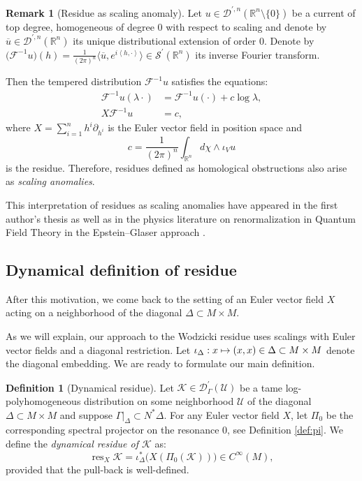 \documentclass[10pt]{amsart}
\let\pazocal\mathscr
\def\mto{\mathchoice{\longmapsto}{\mapsto}{\mapsto}{\mapsto}}
\theoremstyle{definition}
\newtheorem{definition}[theorem]{Definition}
\newtheorem{remark}[theorem]{Remark}
\newcommand\rr{{\mathbb R}}
\let\euler X
\let\Feuler V
\let\exd u
\DeclareMathOperator{\resnorm}{res}
\newcommand{\resdyn}{{\resnorm_\euler}}
\begin{document}
\begin{remark}[Residue as scaling anomaly]\label{l:scalanomal}
Let $\exd\in \pazocal{D}^{\prime,n}(\rr^n\setminus\{0\})$ be a current of top degree, homogeneous of degree $0$ with respect to scaling and denote by $\overline{\exd}\in \pazocal{D}^{\prime,n}(\rr^n)$ its unique distributional extension of order $0$.
Denote by $\big(\pazocal{F}^{-1}\exd\big)(h)=\frac{1}{(2\pi)^n}\langle \overline{\exd}, e^{i\left\langle h,\cdot \right\rangle}\rangle\in \pazocal{S}^\prime(\rr^n)$ its inverse Fourier transform.

Then the tempered distribution $\pazocal{F}^{-1}\exd$ satisfies the equations:
\[
\begin{aligned}
\pazocal{F}^{-1}\exd(\lambda\cdot)&=\pazocal{F}^{-1}\exd(\cdot)+c\log\lambda,\\
\euler \pazocal{F}^{-1}\exd&=c,
\end{aligned}
\]
where $\euler=\sum_{i=1}^n h^i\partial_{h^i}$ is the Euler vector field in position space and
\[
c=\frac{1}{(2\pi)^n}\int_{\rr^n} d\chi\wedge \iota_\Feuler \exd
\]
is the residue. Therefore, residues defined as homological obstructions also arise as \emph{scaling anomalies}.
\end{remark}

This interpretation of residues as scaling anomalies have appeared in the first author's thesis \cite[\S8]{dangthesis} as well as in the physics literature on renormalization in Quantum Field Theory in the Epstein--Glaser approach \cite{Nikolov2013,Gracia-Bondia2014,Rejzner2020}.

\subsection{Dynamical definition of residue} After this motivation, we come back to the setting of an Euler vector field $\euler$ acting on a neighborhood of the diagonal $\Delta\subset M\times M$.

As we will explain, our approach to the Wodzicki residue uses scalings with Euler vector fields and a diagonal restriction.
Let $\iota_\Delta: x\mto (x,x)\in \Delta\subset M\times M$
denote the diagonal embedding.
We are ready to formulate our main definition.
\begin{definition}[Dynamical residue]
Let $\pazocal{K}\in \pazocal{D}^\prime_\Gamma(\pazocal{U})$ be a tame log-poly\-homo\-geneous distribution on some neighborhood $\pazocal{U}$ of the diagonal $\Delta\subset M\times M$
and suppose $\Gamma|_{\Delta}\subset N^*\Delta$.
For any Euler vector field $\euler$, let $\Pi_0$
be the corresponding spectral projector on the resonance $0$, see Definition \ref{def:pi}. We define
the \emph{dynamical residue of $\pazocal{K}$} as:
\[
\resdyn \pazocal{K} = \iota_\Delta^*\big(\euler (\Pi_0(\pazocal{K}))\big) \in C^\infty(M),
\]
provided that the pull-back is well-defined.
\end{definition}
\end{document}
